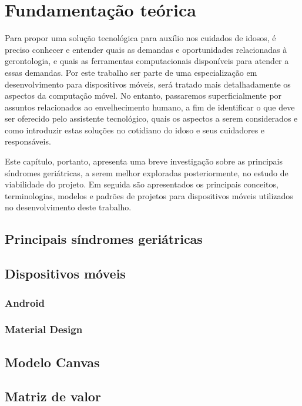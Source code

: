 \chapter{Fundamentação teórica}

Para propor uma solução tecnológica para auxílio nos cuidados de idosos, é preciso conhecer e entender quais as demandas e oportunidades relacionadas à gerontologia, e quais as ferramentas computacionais disponíveis para atender a essas demandas. Por este trabalho ser parte de uma especialização em desenvolvimento para dispositivos móveis, será tratado mais detalhadamente os aspectos da computação móvel. No entanto, passaremos superficialmente por assuntos relacionados ao envelhecimento humano, a fim de identificar o que deve ser oferecido pelo assistente tecnológico, quais os aspectos a serem considerados e como introduzir estas soluções no cotidiano do idoso e seus cuidadores e responsáveis.

Este capítulo, portanto, apresenta uma breve investigação sobre as principais síndromes geriátricas, a serem melhor exploradas posteriormente, no estudo de viabilidade do projeto. Em seguida são apresentados os principais conceitos, terminologias, modelos e padrões de projetos para dispositivos móveis utilizados no desenvolvimento deste trabalho.

\section{Principais síndromes geriátricas}

\section{Dispositivos móveis}

\subsection{Android}

\subsection{Material Design}

\section{Modelo Canvas}

\section{Matriz de valor}


